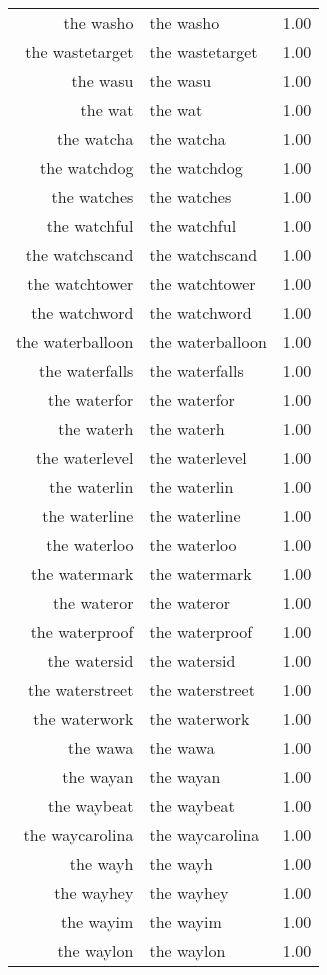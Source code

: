 \begin{table}[ht]
\begin{tabular}{rlr}
  the washo & the washo & 1.00 \\ 
  the wastetarget & the wastetarget & 1.00 \\ 
  the wasu & the wasu & 1.00 \\ 
  the wat & the wat & 1.00 \\ 
  the watcha & the watcha & 1.00 \\ 
  the watchdog & the watchdog & 1.00 \\ 
  the watches & the watches & 1.00 \\ 
  the watchful & the watchful & 1.00 \\ 
  the watchscand & the watchscand & 1.00 \\ 
  the watchtower & the watchtower & 1.00 \\ 
  the watchword & the watchword & 1.00 \\ 
  the waterballoon & the waterballoon & 1.00 \\ 
  the waterfalls & the waterfalls & 1.00 \\ 
  the waterfor & the waterfor & 1.00 \\ 
  the waterh & the waterh & 1.00 \\ 
  the waterlevel & the waterlevel & 1.00 \\ 
  the waterlin & the waterlin & 1.00 \\ 
  the waterline & the waterline & 1.00 \\ 
  the waterloo & the waterloo & 1.00 \\ 
  the watermark & the watermark & 1.00 \\ 
  the wateror & the wateror & 1.00 \\ 
  the waterproof & the waterproof & 1.00 \\ 
  the watersid & the watersid & 1.00 \\ 
  the waterstreet & the waterstreet & 1.00 \\ 
  the waterwork & the waterwork & 1.00 \\ 
  the wawa & the wawa & 1.00 \\ 
  the wayan & the wayan & 1.00 \\ 
  the waybeat & the waybeat & 1.00 \\ 
  the waycarolina & the waycarolina & 1.00 \\ 
  the wayh & the wayh & 1.00 \\ 
  the wayhey & the wayhey & 1.00 \\ 
  the wayim & the wayim & 1.00 \\ 
  the waylon & the waylon & 1.00 \\ 

\end{tabular}
\end{table}
